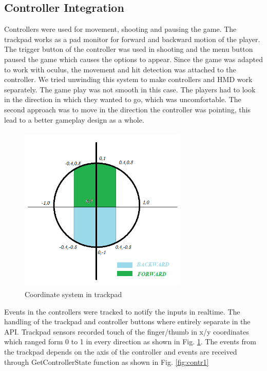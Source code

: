\documentclass[journal]{IEEEtran}
\begin{document}
\subsection{Controller Integration}
Controllers were used for movement, shooting and pausing the game. The trackpad works as a pad monitor for forward and backward motion of the player. The trigger button of the controller was used in shooting and the menu button paused the game which causes the options to appear. Since the game was adapted to work with oculus, the movement and hit detection was attached to the controller. We tried unwinding this system to make controllers and HMD work separately. The game play was not smooth in this case. The players had to look in the direction in which they wanted to go, which was uncomfortable. The second approach was to move in the direction the controller was pointing, this lead to a better gameplay design as a whole. 

\begin{figure}[h]
	\includegraphics[width=8cm, height=8cm]{controller} 
	\centering
	\caption{Coordinate system in trackpad \label{fig:contr}}
\end{figure}

Events in the controllers were tracked to notify the inputs in realtime. The handling of the trackpad and controller buttons where entirely separate in the API. Trackpad sensors recorded touch of the finger/thumb in x/y coordinates which ranged form 0 to 1 in every direction as shown in Fig. \ref{fig:contr}. The events from the trackpad depends on the axis of the controller and events are received through GetControllerState function as shown in  Fig. \ref{fig:contr1}
\end{document}
